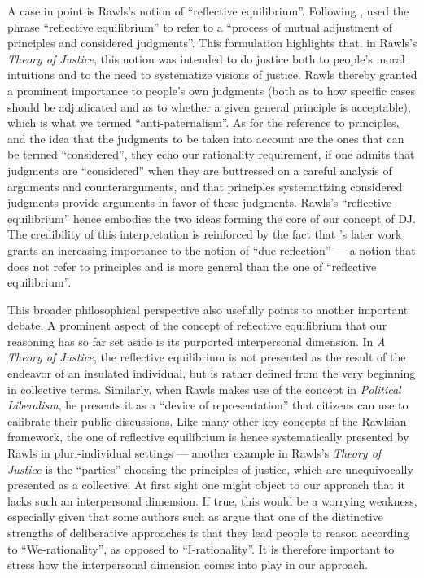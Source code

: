 \documentclass[version=3.21, pagesize, twoside=off, bibliography=totoc, DIV=calc, fontsize=12pt, a4paper, french, english]{scrartcl}
\begin{document}
A case in point is Rawls’s notion of “reflective equilibrium”. 
Following \citet{goodman_fact_1983}, \citet[][p.18]{rawls_theory_1999} used the phrase “reflective equilibrium” to refer to a “process of mutual adjustment of principles and considered judgments”. 
This formulation highlights that, in Rawls’s \emph{Theory of Justice}, this notion was intended to do justice both to people’s moral intuitions and to the need to systematize visions of justice. 
Rawls thereby granted a prominent importance to people’s own judgments (both as to how specific cases should be adjudicated and as to whether a given general principle is acceptable), which is what we termed  “anti-paternalism”. 
As for the reference to principles, and the idea that the judgments to be taken into account are the ones that can be termed “considered”, they echo our rationality requirement, if one admits that judgments are  “considered” when they are buttressed on a careful analysis of arguments and counterarguments, and that principles systematizing considered judgments provide arguments in favor of these judgments. 
Rawls’s “reflective equilibrium” hence embodies the two ideas forming the core of our concept of \ac{DJ}. 
The credibility of this interpretation is reinforced by the fact that \citeauthor{rawls_political_2005}’s \citeyearpar{rawls_political_2005} later work grants an increasing importance to the notion of “due reflection” --- a notion that does not refer to principles and is more general than the one of “reflective equilibrium”. 

This broader philosophical perspective also usefully points to another important debate. 
A prominent aspect of the concept of reflective equilibrium that our reasoning has so far set aside is its purported interpersonal dimension. 
In \emph{A Theory of Justice}, the reflective equilibrium is not presented as the result of the endeavor of an insulated individual, but is rather defined from the very beginning in collective terms. 
Similarly, when Rawls makes use of the concept in \emph{Political Liberalism}, he presents it as a  “device of representation” that citizens can use to calibrate their public discussions. 
Like many other key concepts of the Rawlsian framework, the one of reflective equilibrium is hence systematically presented by Rawls in pluri-individual settings --- another example in Rawls’s \emph{Theory of Justice} is the “parties” choosing the principles of justice, which are unequivocally presented as a collective. 
At first sight one might object to our approach that it lacks such an interpersonal dimension.
If true, this would be a worrying weakness, especially given that some authors such as \citet{vatn_institutional_2009} argue that one of the distinctive strengths of deliberative approaches is that they lead people to reason according to “We-rationality”, as opposed to “I-rationality”. 
It is therefore important to stress how the interpersonal dimension comes into play in our approach.
\end{document}
